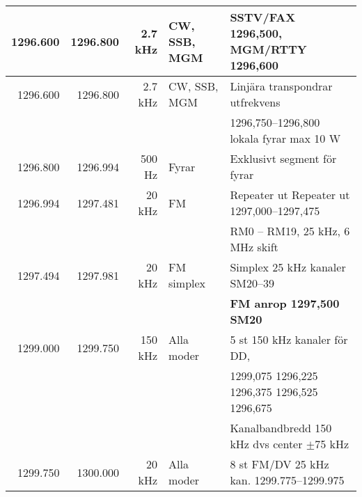 \begin{tabular}{rrrll}
	         1296.600 & 1296.800 &     2.7 kHz & CW, SSB, MGM    & SSTV/FAX 1296,500, MGM/RTTY 1296,600          \\ \hline
	         1296.600 & 1296.800 &     2.7 kHz & CW, SSB, MGM    & Linjära transpondrar utfrekvens               \\
	                  &          &             &                 & 1296,750--1296,800 lokala fyrar max 10 W      \\ \hline
	         1296.800 & 1296.994 &      500 Hz & Fyrar           & Exklusivt segment för fyrar                   \\ \hline
	         1296.994 & 1297.481 &      20 kHz & FM              & Repeater ut Repeater ut 1297,000--1297,475    \\
	                  &          &             &                 & RM0 – RM19, 25 kHz, 6 MHz skift               \\ \hline
	         1297.494 & 1297.981 &      20 kHz & FM simplex      & Simplex 25 kHz kanaler SM20--39               \\
	                  &          &             &                 & \textbf{FM anrop 1297,500 SM20}               \\ \hline
	         1299.000 & 1299.750 &     150 kHz & Alla moder      & 5 st 150 kHz kanaler för DD,                  \\
	                  &          &             &                 & 1299,075 1296,225 1296,375  1296,525 1296,675 \\
	                  &          &             &                 & Kanalbandbredd 150 kHz dvs center $\pm$75 kHz \\ \hline
	         1299.750 & 1300.000 &      20 kHz & Alla moder      & 8 st FM/DV 25 kHz kan. 1299.775--1299.975
\end{tabular}

\clearpage

\twocolumn
